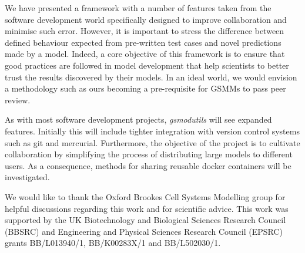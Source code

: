 \documentclass[journal=asbcd6,10pt]{achemso}
\begin{document}
We have presented a framework with a number of features taken from the software development world specifically designed to improve collaboration and minimise such error.
However, it is important to stress the difference between defined behaviour expected from pre-written test cases and novel predictions made by a model.
Indeed, a core objective of this framework is to ensure that good practices are followed in model development that help scientists to better trust the results discovered by their models.
In an ideal world, we would envision a methodology such as ours becoming a pre-requisite for GSMMs to pass peer review.

As with most software development projects, \textit{gsmodutils} will see expanded features.
Initially this will include tighter integration with version control systems such as git and mercurial.
Furthermore, the objective of the project is to cultivate collaboration by simplifying the process of distributing large models to different users.
As a consequence, methods for sharing reusable docker containers will be investigated.


\begin{acknowledgement}
We would like to thank the Oxford Brookes Cell Systems Modelling group for helpful discussions regarding this work and for scientific advice.
This work was supported by the UK Biotechnology and Biological Sciences Research Council (BBSRC) and Engineering and Physical Sciences Research Council (EPSRC) grants BB/L013940/1,  BB/K00283X/1 and BB/L502030/1.
\end{acknowledgement}



\end{document}
